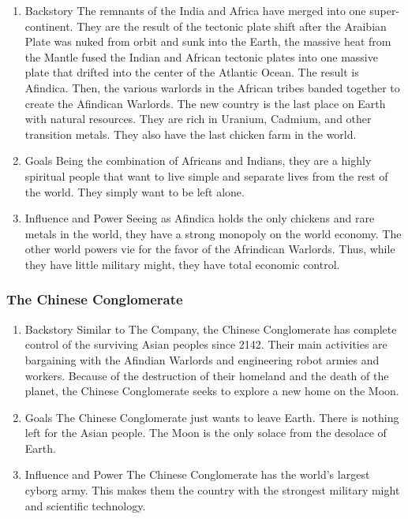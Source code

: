 \documentclass[11pt]{article}
\begin{document}
\begin{enumerate}
\item Backstory
\label{sec:org6232806}
The remnants of the India and Africa have merged into one super-continent. They are the result of the tectonic plate shift after the Araibian Plate was nuked from orbit and sunk into the Earth, the massive heat from the Mantle fused the Indian and African tectonic plates into one massive plate that drifted into the center of the Atlantic Ocean. The result is Afindica. Then, the various warlords in the African tribes banded together to create the Afindican Warlords. The new country is the last place on Earth with natural resources. They are rich in Uranium, Cadmium, and other transition metals. They also have the last chicken farm in the world.

\item Goals
\label{sec:org764067d}
Being the combination of Africans and Indians, they are a highly spiritual people that want to live simple and separate lives from the rest of the world. They simply want to be left alone.

\item Influence and Power
\label{sec:orgbeea05b}
Seeing as Afindica holds the only chickens and rare metals in the world, they have a strong monopoly on the world economy. The other world powers vie for the favor of the Afrindican Warlords. Thus, while they have little military might, they have total economic control.
\end{enumerate}

\subsubsection{The Chinese Conglomerate}
\label{sec:org898c0d0}

\begin{enumerate}
\item Backstory
\label{sec:org8fa26aa}
Similar to The Company, the Chinese Conglomerate has complete control of the surviving Asian peoples since 2142. Their main activities are bargaining with the Afindian Warlords and engineering robot armies and workers. Because of the destruction of their homeland and the death of the planet, the Chinese Conglomerate seeks to explore a new home on the Moon.

\item Goals
\label{sec:org0d3da63}
The Chinese Conglomerate just wants to leave Earth. There is nothing left for the Asian people. The Moon is the only solace from the desolace of Earth.

\item Influence and Power
\label{sec:org1083833}
The Chinese Conglomerate has the world's largest cyborg army. This makes them the country with the strongest military might and scientific technology.
\end{enumerate}
\end{document}

